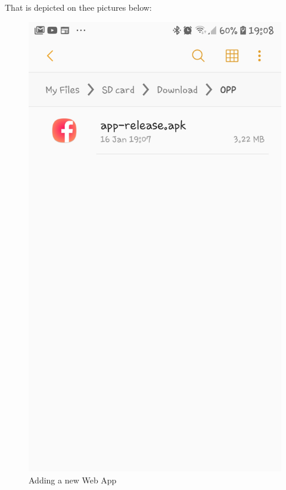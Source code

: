 				That is depicted on thee pictures below:
				\begin{figure}[H]
					\includegraphics[width=\linewidth]{images/Android_1.jpg}
					\caption{Adding a new Web App}
					\label{fig:android_1}
				\end{figure}
			
